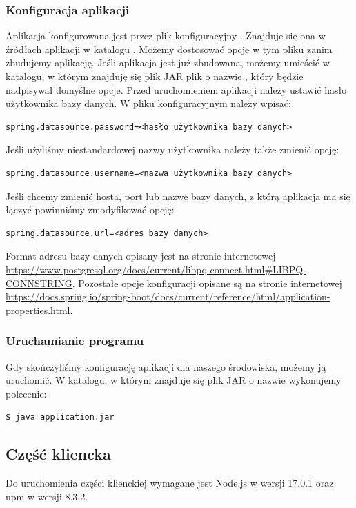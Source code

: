 \documentclass[shortabstract,inz]{iithesis}
\begin{document}
\subsubsection*{Konfiguracja aplikacji}
Aplikacja konfigurowana jest przez plik konfiguracyjny . Znajduje się ona w źródłach aplikacji w katalogu . Możemy dostosować opcje w tym pliku zanim zbudujemy aplikację. Jeśli aplikacja jest już zbudowana, możemy umieścić w katalogu, w którym znajduję się plik JAR plik o nazwie , który będzie nadpisywał domyślne opcje. 
Przed uruchomieniem aplikacji należy ustawić hasło użytkownika bazy danych. W pliku konfiguracyjnym należy wpisać:
   \begin{lstlisting}
spring.datasource.password=<hasło użytkownika bazy danych>
	\end{lstlisting}
Jeśli użyliśmy niestandardowej nazwy użytkownika należy także zmienić opcję:
	\begin{lstlisting}
spring.datasource.username=<nazwa użytkownika bazy danych>
	\end{lstlisting}
Jeśli chcemy zmienić hosta, port lub nazwę bazy danych, z którą aplikacja ma się łączyć powinniśmy zmodyfikować opcję:
	\begin{lstlisting}
spring.datasource.url=<adres bazy danych>
	\end{lstlisting}
Format adresu bazy danych opisany jest na stronie internetowej \url{https://www.postgresql.org/docs/current/libpq-connect.html#LIBPQ-CONNSTRING}.
Pozostałe opcje konfiguracji opisane są na stronie internetowej \url{https://docs.spring.io/spring-boot/docs/current/reference/html/application-properties.html}.

\subsubsection{Uruchamianie programu}
Gdy skończyliśmy konfigurację aplikacji dla naszego środowiska, możemy ją uruchomić. 
\noindend W katalogu, w którym znajduje się plik JAR o nazwie  wykonujemy polecenie:
\begin{lstlisting}[language=bash]
  $ java application.jar
\end{lstlisting}

\subsection*{Część kliencka}
Do uruchomienia części klienckiej wymagane jest Node.js \citep{nodejs} w wersji 17.0.1 oraz npm \citep{npm} w wersji 8.3.2.
\end{document}
